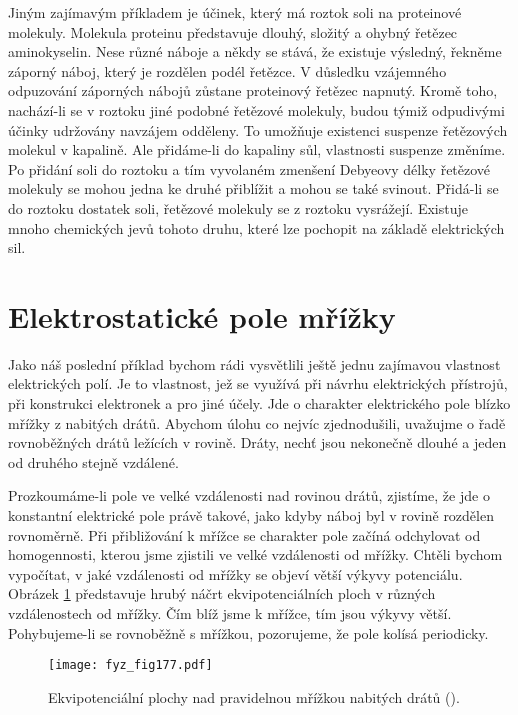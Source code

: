   Jiným zajímavým příkladem je účinek, který má roztok soli na proteinové molekuly. Molekula
  proteinu představuje dlouhý, složitý a ohybný řetězec aminokyselin. Nese různé náboje a někdy se
  stává, že existuje výsledný, řekněme záporný náboj, který je rozdělen podél řetězce. V důsledku
  vzájemného odpuzování záporných nábojů zůstane proteinový řetězec napnutý. Kromě toho, nachází-li
  se v roztoku jiné podobné řetězové molekuly, budou týmiž odpudivými účinky udržovány navzájem
  odděleny. To umožňuje existenci suspenze řetězových molekul v kapalině. Ale přidáme-li do kapaliny
  sůl, vlastnosti suspenze změníme. Po přidání soli do roztoku a tím vyvolaném zmenšení Debyeovy
  délky řetězové molekuly se mohou jedna ke druhé přiblížit a mohou se také svinout. Přidá-li se do
  roztoku dostatek soli, řetězové molekuly se z roztoku vysrážejí. Existuje mnoho chemických jevů
  tohoto druhu, které lze pochopit na základě elektrických sil.

\section{Elektrostatické pole mřížky}\label{fyz:IIchapVsecXXVI} 
  Jako náš poslední příklad bychom rádi vysvětlili ještě jednu zajímavou vlastnost elektrických
  polí. Je to vlastnost, jež se využívá při návrhu elektrických přístrojů, při konstrukci elektronek
  a pro jiné účely. Jde o charakter elektrického pole blízko mřížky z nabitých drátů. Abychom úlohu
  co nejvíc zjednodušili, uvažujme o řadě rovnoběžných drátů ležících v rovině. Dráty, nechť jsou
  nekonečně dlouhé a jeden od druhého stejně vzdálené.

  Prozkoumáme-li pole ve velké vzdálenosti nad rovinou drátů, zjistíme, že jde o konstantní
  elektrické pole právě takové, jako kdyby náboj byl v rovině rozdělen rovnoměrně. Při přibližování
  k mřížce se charakter pole začíná odchylovat od homogennosti, kterou jsme zjistili ve velké
  vzdálenosti od mřížky. Chtěli bychom vypočítat, v jaké vzdálenosti od mřížky se objeví větší
  výkyvy potenciálu. Obrázek \ref{fyz:fig177} představuje hrubý náčrt ekvipotenciálních ploch v
  různých vzdálenostech od mřížky. Čím blíž jsme k mřížce, tím jsou výkyvy větší. Pohybujeme-li se
  rovnoběžně s mřížkou, pozorujeme, že pole kolísá periodicky.

  \begin{figure}[ht!]  %
    \centering
    \texttt{[image: fyz\_fig177.pdf]}
    \caption{Ekvipotenciální plochy nad pravidelnou mřížkou nabitých drátů
             (\cite[s.~136]{Feynman02}).}
    \label{fyz:fig177}
  \end{figure}

